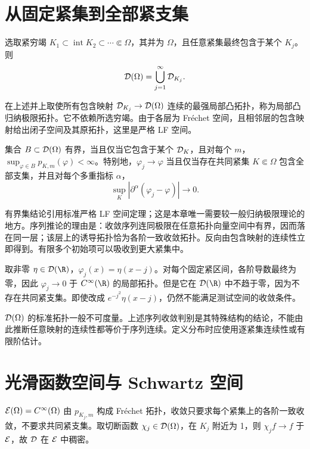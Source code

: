 \section{从固定紧集到全部紧支集}
选取紧穷竭 $K_1\subset\operatorname{int}K_2\subset\cdots\Subset\Omega$，其并为 $\Omega$，且任意紧集最终包含于某个 $K_j$。则
\[
 \mathcal{D}(\Omega)=\bigcup_{j=1}^\infty\mathcal{D}_{K_j}.
\]
\begin{definition}[标准测试函数拓扑]
在上述并上取使所有包含映射 $\mathcal{D}_{K_j}\to\mathcal{D}(\Omega)$ 连续的最强局部凸拓扑，称为局部凸归纳极限拓扑。它不依赖所选穷竭。由于各层为 Fréchet 空间，且相邻层的包含映射给出闭子空间及其原拓扑，这里是严格 LF 空间。
\end{definition}
\begin{theorem}[测试空间的有界集与序列收敛]\label{thm:D-convergence}
集合 $B\subset\mathcal{D}(\Omega)$ 有界，当且仅当它包含于某个 $\mathcal{D}_K$，且对每个 $m$，$\sup_{\varphi\in B}p_{K,m}(\varphi)<\infty$。特别地，$\varphi_j\to\varphi$ 当且仅当存在共同紧集 $K\Subset\Omega$ 包含全部支集，并且对每个多重指标 $\alpha$，
\[
 \sup_K|\partial^\alpha(\varphi_j-\varphi)|\longrightarrow0.
\]
\end{theorem}
有界集结论引用标准严格 LF 空间定理；这是本章唯一需要较一般归纳极限理论的地方。序列推论的理由是：收敛序列连同极限在任意拓扑向量空间中有界，因而落在同一层；该层上的诱导拓扑恰为各阶一致收敛拓扑。反向由包含映射的连续性立即得到。有限多个初始项可以吸收到更大紧集中。

\begin{example}[支集逃向无穷远]
取非零 $\eta\in\Test(\R)$，$\varphi_j(x)=\eta(x-j)$。对每个固定紧区间，各阶导数最终为零，因此 $\varphi_j\to0$ 于 $C^\infty(\R)$ 的局部拓扑。但是它在 $\Test(\R)$ 中不趋于零，因为不存在共同紧支集。即使改成 $e^{-j^2}\eta(x-j)$，仍然不能满足测试空间的收敛条件。
\end{example}
\begin{pitfall}[序列判别的使用边界]
$\mathcal{D}(\Omega)$ 的标准拓扑一般不可度量。上述序列收敛判别是其特殊结构的结论，不能由此推断任意映射的连续性都等价于序列连续。定义分布时应使用逐紧集连续性或有限阶估计。
\end{pitfall}

\section{光滑函数空间与 Schwartz 空间}
$\mathcal{E}(\Omega)=C^\infty(\Omega)$ 由 $p_{K_j,m}$ 构成 Fréchet 拓扑，收敛只要求每个紧集上的各阶一致收敛，不要求共同紧支集。取切断函数 $\chi_j\in\mathcal{D}(\Omega)$，在 $K_j$ 附近为 1，则 $\chi_jf\to f$ 于 $\mathcal{E}$，故 $\mathcal{D}$ 在 $\mathcal{E}$ 中稠密。

